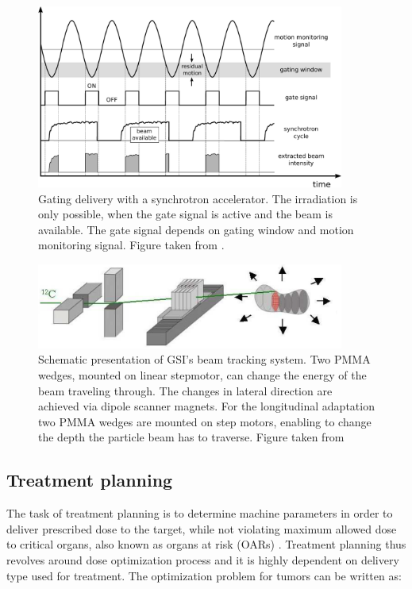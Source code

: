 \documentclass[type=dr, dr=rernat, accentcolor=tud7b,colorbacktitle, bigchapter, openright, twoside, 12pt ]{tudthesis}
\begin{document}
\begin{figure}[tbp]
  \centering
  \includegraphics[width=0.9\textwidth]{./Images/gatingscheme.pdf}
  \caption{Gating delivery with a synchrotron accelerator. The irradiation is only possible, when the gate signal is active and the beam is available. The gate signal
  depends on gating window and motion monitoring signal. Figure taken from \cite{Richter2012}.}
  \label{gating}
\end{figure}

\newpage
\begin{figure}[H]
\begin{center}
\includegraphics[width=0.9\textwidth]{./Images/tracking.png}
\caption{Schematic presentation of GSI's beam tracking system. Two PMMA wedges, mounted on linear stepmotor, can change the energy of the beam traveling through. The changes in lateral direction are achieved via dipole scanner magnets. For the longitudinal adaptation two 
PMMA wedges are mounted on step motors, enabling to change the depth the particle beam has to traverse. Figure taken from \cite{Groezinger2004}}
\label{tracking}
\end{center}
\end{figure}

\subsection{Treatment planning}
\label{treatmentPlanning}

The task of treatment planning is to determine machine parameters in order to deliver prescribed dose to the target, while not violating maximum allowed dose to critical organs, also known as organs at risk (OARs) \cite{Richter2012}.
Treatment planning thus revolves around dose optimization process and it is highly dependent on delivery type used for treatment. The optimization problem for tumors can be written as:
\end{document}
